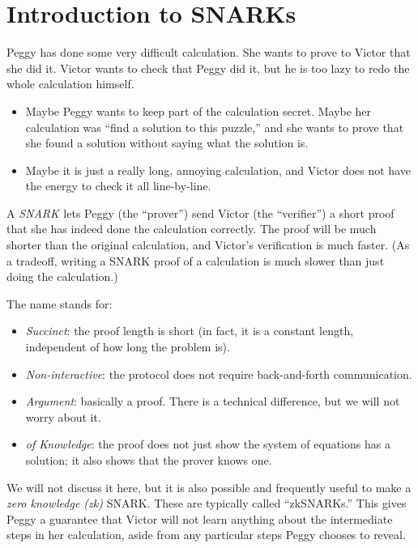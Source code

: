 \section{Introduction to SNARKs}

Peggy has done some very difficult calculation. She wants to prove to
Victor that she did it. Victor wants to check that Peggy did it, but he
is too lazy to redo the whole calculation himself.

\begin{itemize}
\item
  Maybe Peggy wants to keep part of the calculation secret. Maybe her
  calculation was ``find a solution to this puzzle,'' and she wants to
  prove that she found a solution without saying what the solution is.
\item
  Maybe it is just a really long, annoying calculation, and Victor does
  not have the energy to check it all line-by-line.
\end{itemize}

A \emph{SNARK}  lets Peggy (the ``prover'') send Victor (the
``verifier'') a short proof that she has indeed done the calculation
correctly. The proof will be much shorter than the original calculation,
and Victor's verification is much faster. (As a tradeoff, writing a
SNARK proof of a calculation is much slower than just doing the
calculation.)

The name stands for:

\begin{itemize}
\item
  \emph{Succinct}: the proof length is short (in fact, it is a constant
  length, independent of how long the problem is).
\item
  \emph{Non-interactive}: the protocol does not require back-and-forth
  communication.
\item
  \emph{Argument}: basically a proof. There is a technical difference,
  but we will not worry about it.
\item
  \emph{of Knowledge}: the proof does not just show the system of
  equations has a solution; it also shows that the prover knows one.
\end{itemize}

We will not discuss it here, but it is also possible and frequently
useful to make a \emph{zero knowledge (zk)} SNARK. These are typically
called ``zkSNARKs.'' This gives Peggy a guarantee that Victor will not
learn anything about the intermediate steps in her calculation, aside
from any particular steps Peggy chooses to reveal.

